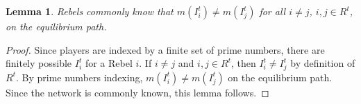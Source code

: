 \documentclass[12pt,letter]{article}
\newtheorem{lemma}{Lemma}[section]
\theoremstyle{definition}
\theoremstyle{definition}
\theoremstyle{remark}
\theoremstyle{claim}
\begin{document}
\begin{lemma}
Rebels commonly know that $m(I^t_i)\neq m(I^t_j)$ for all $i\neq j$, $i,j\in R^t$, on the equilibrium path. 
\end{lemma}
\begin{proof}
Since players are indexed by a finite set of prime numbers, there are finitely possible $I^t_i$ for a Rebel $i$. If $i\neq j$ and $i,j\in R^t$, then $I^t_i\neq I^t_j$ by definition of $R^t$. By prime numbers indexing, $m(I^t_i)\neq m(I^t_j)$ on the equilibrium path. Since the network is commonly known, this lemma follows. 
\end{proof}


%
%
%
\end{document}
